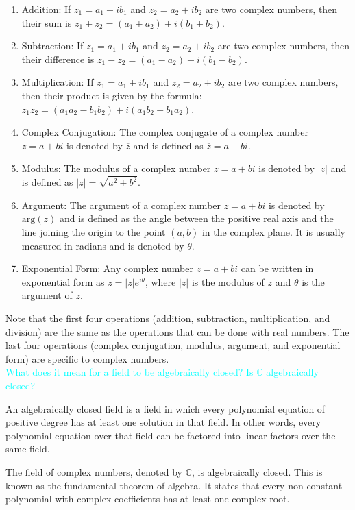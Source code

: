 \documentclass[fontsize=12pt]{scrartcl}
\begin{document}
\begin{enumerate}
	\item Addition: If $z_1=a_1+ib_1$ and $z_2=a_2+ib_2$ are two complex numbers, then their sum is $z_1+z_2=(a_1+a_2)+i(b_1+b_2)$.
	\item Subtraction: If $z_1=a_1+ib_1$ and $z_2=a_2+ib_2$ are two complex numbers, then their difference is $z_1-z_2=(a_1-a_2)+i(b_1-b_2)$.
	\item Multiplication: If $z_1=a_1+ib_1$ and $z_2=a_2+ib_2$ are two complex numbers, then their product is given by the formula: $z_1z_2=(a_1a_2-b_1b_2)+i(a_1b_2+b_1a_2)$.
	\item Complex Conjugation: The complex conjugate of a complex number $z=a+bi$ is denoted by $\overline{z}$ and is defined as $\overline{z}=a-bi$.
	\item Modulus: The modulus of a complex number $z=a+bi$ is denoted by $|z|$ and is defined as $|z|=\sqrt{a^2+b^2}$.
	\item Argument: The argument of a complex number $z=a+bi$ is denoted by $\text{arg}(z)$ and is defined as the angle between the positive real axis and the line joining the origin to the point $(a,b)$ in the complex plane. It is usually measured in radians and is denoted by $\theta$.
	\item Exponential Form: Any complex number $z=a+bi$ can be written in exponential form as $z=|z|e^{i\theta}$, where $|z|$ is the modulus of $z$ and $\theta$ is the argument of $z$.
\end{enumerate}

\noindent
Note that the first four operations (addition, subtraction, multiplication, and division) are the same as the operations that can be done with real numbers. The last four operations (complex conjugation, modulus, argument, and exponential form) are specific to complex numbers.
\\

\noindent
\textcolor{cyan}{What does it mean for a field to be algebraically closed? Is $\mathbb{C}$ algebraically closed?}

\noindent
An algebraically closed field is a field in which every polynomial equation of positive degree has at least one solution in that field. In other words, every polynomial equation over that field can be factored into linear factors over the same field.

\noindent
The field of complex numbers, denoted by $\mathbb{C}$, is algebraically closed. This is known as the fundamental theorem of algebra. It states that every non-constant polynomial with complex coefficients has at least one complex root.
\end{document}
